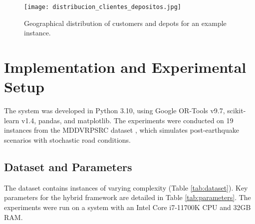 \documentclass[conference]{IEEEtran} %
\begin{document}
\begin{figure}[H]
    \centering
    \texttt{[image: distribucion\_clientes\_depositos.jpg]}
    \caption{Geographical distribution of customers and depots for an example instance.}
    \label{fig:geographical_distribution}
\end{figure}

\section{Implementation and Experimental Setup}
The system was developed in Python 3.10, using Google OR-Tools v9.7, scikit-learn v1.4, pandas, and matplotlib. The experiments were conducted on 19 instances from the MDDVRPSRC dataset \cite{yu2020multi}, which simulates post-earthquake scenarios with stochastic road conditions.

\subsection{Dataset and Parameters}
The dataset contains instances of varying complexity (Table \ref{tab:dataset}). Key parameters for the hybrid framework are detailed in Table \ref{tab:parameters}. The experiments were run on a system with an Intel Core i7-11700K CPU and 32GB RAM.

\begin{table}[ht]
\centering
\caption{Characteristics of the MDVRP Dataset Used}
\label{tab:dataset}
\end{table}
\end{document}
